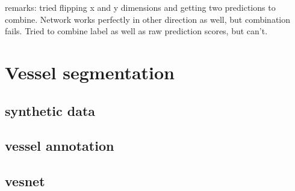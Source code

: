 \documentclass[a4paper,11pt,english,german]{book}
\begin{document}
remarks: tried flipping x and y dimensions and getting two predictions to combine. Network works perfectly in other direction as well, but combination fails. Tried to combine label as well as raw prediction scores, but can't.

\section{Vessel segmentation}
\subsection{synthetic data}

\subsection{vessel annotation}


\subsection{vesnet}



\appendix


\end{document}
